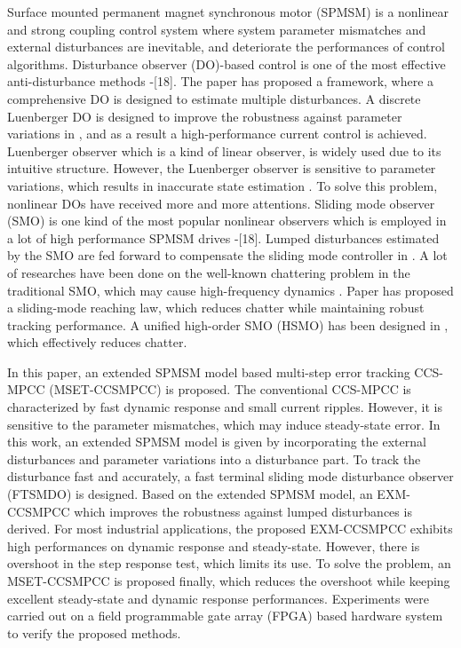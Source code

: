 \documentclass[a4paper, 8pt, twocolumn]{IEEEtran}
\begin{document}
Surface mounted permanent magnet synchronous motor (SPMSM) is a nonlinear and strong coupling control system where system parameter mismatches and external disturbances are inevitable, and deteriorate the performances of control algorithms. Disturbance observer (DO)-based control is one of the most effective anti-disturbance methods \cite{8272461}-[18]. The paper \cite{8272461} has proposed a framework, where a comprehensive DO is designed to estimate multiple disturbances. A discrete Luenberger DO is designed to improve the robustness against parameter variations in \cite{7552585}, and as a result a high-performance current control is achieved. Luenberger observer which is a kind of linear observer, is widely used due to its intuitive structure. However, the Luenberger observer is sensitive to parameter variations, which results in inaccurate state estimation \cite{52961}. To solve this problem, nonlinear DOs have received more and more attentions. Sliding mode observer (SMO) is one kind of the most popular nonlinear observers which is employed in a lot of high performance SPMSM drives \cite{7811352}-[18]. Lumped disturbances estimated by the SMO are fed forward to compensate the sliding mode controller in \cite{7811352}. A lot of researches have been done on the well-known chattering problem in the traditional SMO, which may cause high-frequency dynamics \cite{6236202}. Paper \cite{7515145} has proposed a sliding-mode reaching law, which reduces chatter while maintaining robust tracking performance. A unified high-order SMO (HSMO) has been designed in \cite{8038828}, which effectively reduces chatter.\par
In this paper, an extended SPMSM model based multi-step error tracking CCS-MPCC (MSET-CCSMPCC) is proposed. The conventional CCS-MPCC is characterized by fast dynamic response and small current ripples. However, it is sensitive to the parameter mismatches, which may induce steady-state error. In this work, an extended SPMSM model is given by incorporating the external disturbances and parameter variations into a disturbance part. To track the disturbance fast and accurately, a fast terminal sliding mode disturbance observer (FTSMDO) is designed. Based on the extended SPMSM model, an EXM-CCSMPCC which improves the robustness against lumped disturbances is derived. For most industrial applications, the proposed EXM-CCSMPCC exhibits high performances on dynamic response and steady-state. However, there is overshoot in the step response test, which limits its use. To solve the problem, an MSET-CCSMPCC is proposed finally, which reduces the overshoot while keeping excellent steady-state and dynamic response performances. Experiments were carried out on a field programmable gate array (FPGA) based hardware system to verify the proposed methods.\par
\end{document}
